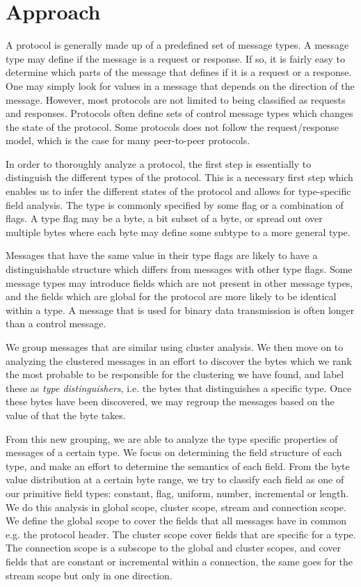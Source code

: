\documentclass[a4paper]{report}
\begin{document}
\section{Approach}
A protocol is generally made up of a predefined set of message types. A
message type may define if the message is a request or response. If so, it is
fairly easy to determine which parts of the message that defines if it is a
request or a response. One may simply look for values in a message that depends
on the direction of the message. However, most protocols are not limited to
being classified as requests and responses. Protocols often define sets of
control message types which changes the state of the protocol. Some protocols
does not follow the request/response model, which is the case for many
peer-to-peer protocols.

In order to thoroughly analyze a protocol, the first step is essentially to
distinguish the different types of the protocol. This is a necessary first
step which enables us to infer the different states of the protocol and allows
for type-specific field analysis. The type is commonly specified by some flag
or a combination of flags. A type flag may be a byte, a bit subset of a byte,
or spread out over multiple bytes where each byte may define some subtype to a
more general type.

Messages that have the same value in their type flags are likely to have a
distinguishable structure which differs from messages with other type flags.
Some message types may introduce fields which are not present in other
message types, and the fields which are global for the protocol are more
likely to be identical within a type. A message that is used for binary data
transmission is often longer than a control message.

We group messages that are similar using cluster analysis. We then move on to
analyzing the clustered messages in an effort to discover the bytes which we
rank the most probable to be responsible for the clustering we have found, and
label these as \emph{type distinguishers}, i.e. the bytes that distinguishes a
specific type. Once these bytes have been discovered, we may regroup the
messages based on the value of that the byte takes.

From this new grouping, we are able to analyze the type specific properties
of messages of a certain type. We focus on determining the field structure of
each type, and make an effort to determine the semantics of each field.
From the byte value distribution at a certain byte range, we try to classify
each field as one of our primitive field types: constant, flag, uniform,
number, incremental or length. We do this analysis in global scope, cluster
scope, stream and connection scope. We define the global scope to cover the
fields that all messages have in common e.g. the protocol header. The cluster
scope cover fields that are specific for a type. The connection scope is a
subscope to the global and cluster scopes, and cover fields that are constant
or incremental within a connection, the same goes for the stream scope but only
in one direction.
\end{document}
